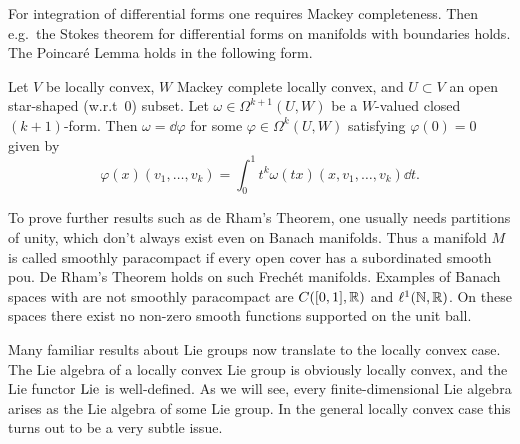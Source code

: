 For integration of differential forms one requires Mackey completeness. Then e.g.\ the Stokes theorem for differential forms on manifolds with boundaries holds. The Poincar\'e Lemma holds in the following form.

\begin{lem}
    Let $V$ be locally convex, $W$ Mackey complete locally convex, and $U\subset V$ an open star-shaped (w.r.t\ $0$) subset. Let $\omega\in \Omega^{k+1}(U,W)$ be a $W$-valued closed $(k+1)$-form. Then $\omega=\dd \varphi$ for some $\varphi\in \Omega^k(U,W)$ satisfying $\varphi(0)=0$ given by
    \[\varphi(x)(v_1,\ldots,v_k)=\int_0^1 t^k\omega(tx)(x,v_1,\ldots,v_k)\dd t.\]
\end{lem}

To prove further results such as de Rham's Theorem, one usually needs partitions of unity, which don't always exist even on Banach manifolds. Thus a manifold $M$ is called smoothly paracompact if every open cover has a subordinated smooth \gls{pou}. De Rham's Theorem holds on such Frech\'et manifolds. Examples of Banach spaces with are not smoothly paracompact are $C([0,1],\mathbb{R})$ and $\ell^1(\mathbb{N},\mathbb{R})$. On these spaces there exist no non-zero smooth functions supported on the unit ball.


Many familiar results about Lie groups now translate to the locally convex case. The Lie algebra of a locally convex Lie group is obviously locally convex, and the Lie functor $\operatorname{Lie}$ is well-defined. As we will see, every finite-dimensional Lie algebra arises as the Lie algebra of some Lie group. In the general locally convex case this turns out to be a very subtle issue.

